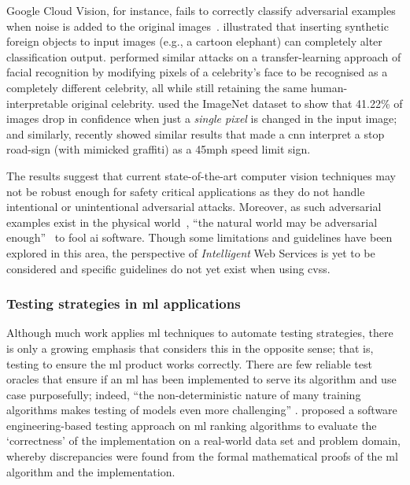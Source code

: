 Google Cloud Vision, for instance, fails to correctly classify adversarial examples when noise is added to the original images~\citep{Hosseini:2018jr}. \citet{Rosenfeld:2018ut} illustrated that inserting synthetic foreign objects to input images (e.g., a cartoon elephant) can completely alter classification output. \citet{Wang:2018vl} performed similar attacks on a transfer-learning approach of facial recognition by modifying pixels of a celebrity's face to be recognised as a completely different celebrity, all while still retaining the same human-interpretable original celebrity. \citet{Su:2017uw} used the ImageNet dataset to show that 41.22\% of images drop in confidence when just a \textit{single pixel} is changed in the input image; and similarly, \citet{Eykholt:2018vk} recently showed similar results that made a \gls{cnn} interpret a stop road-sign (with mimicked graffiti) as a 45mph speed limit sign.

The results suggest that current state-of-the-art computer vision techniques may not be robust enough for safety critical applications as they do not handle intentional or unintentional adversarial attacks. Moreover, as such adversarial examples exist in the physical world~\citep{Kurakin:2016vw,Eykholt:2018vk}, ``the natural world may be adversarial enough''~\citep{Pezzementi:2018tq} to fool \gls{ai} software. Though some limitations and guidelines have been explored in this area, the perspective of \textit{Intelligent} Web Services is yet to be considered and specific guidelines do not yet exist when using \glspl{cvs}.

\subsubsection[Testing strategies in ML applications]{Testing strategies in \gls{ml} applications}

Although much work applies \gls{ml} techniques to automate testing strategies, there is only a growing emphasis that considers this in the opposite sense; that is, testing to ensure the \gls{ml} product works correctly. There are few reliable test oracles that ensure if an \gls{ml} has been implemented to serve its algorithm and use case purposefully; indeed, ``the non-deterministic nature of many training algorithms makes testing of models even more challenging'' \citep{Arpteg2018}.
\citet{murphy2007approach} proposed a software engineering-based testing approach on \gls{ml} ranking algorithms to evaluate the `correctness' of the implementation on a real-world data set and problem domain, whereby discrepancies were found from the formal mathematical proofs of the \gls{ml} algorithm and the implementation. 

